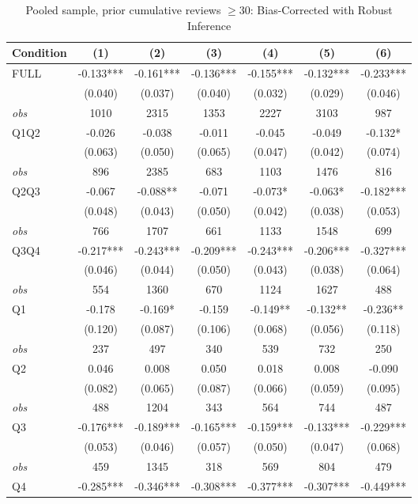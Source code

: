 \begin{table}[!htbp]
\centering
\caption{Pooled sample, prior cumulative reviews $\geq30$: Bias-Corrected with Robust Inference}
\begin{tabular}{lcccccc}
\toprule
Condition & (1) & (2) & (3) & (4) & (5) & (6) \\
\midrule
FULL & -0.133*** & -0.161*** & -0.136*** & -0.155*** & -0.132*** & -0.233*** \\
 & (0.040) & (0.037) & (0.040) & (0.032) & (0.029) & (0.046) \\
\textit{obs} & 1010 & 2315 & 1353 & 2227 & 3103 & 987 \\
Q1Q2 & -0.026 & -0.038 & -0.011 & -0.045 & -0.049 & -0.132* \\
 & (0.063) & (0.050) & (0.065) & (0.047) & (0.042) & (0.074) \\
\textit{obs} & 896 & 2385 & 683 & 1103 & 1476 & 816 \\
Q2Q3 & -0.067 & -0.088** & -0.071 & -0.073* & -0.063* & -0.182*** \\
 & (0.048) & (0.043) & (0.050) & (0.042) & (0.038) & (0.053) \\
\textit{obs} & 766 & 1707 & 661 & 1133 & 1548 & 699 \\
Q3Q4 & -0.217*** & -0.243*** & -0.209*** & -0.243*** & -0.206*** & -0.327*** \\
 & (0.046) & (0.044) & (0.050) & (0.043) & (0.038) & (0.064) \\
\textit{obs} & 554 & 1360 & 670 & 1124 & 1627 & 488 \\
Q1 & -0.178 & -0.169* & -0.159 & -0.149** & -0.132** & -0.236** \\
 & (0.120) & (0.087) & (0.106) & (0.068) & (0.056) & (0.118) \\
\textit{obs} & 237 & 497 & 340 & 539 & 732 & 250 \\
Q2 & 0.046 & 0.008 & 0.050 & 0.018 & 0.008 & -0.090 \\
 & (0.082) & (0.065) & (0.087) & (0.066) & (0.059) & (0.095) \\
\textit{obs} & 488 & 1204 & 343 & 564 & 744 & 487 \\
Q3 & -0.176*** & -0.189*** & -0.165*** & -0.159*** & -0.133*** & -0.229*** \\
 & (0.053) & (0.046) & (0.057) & (0.050) & (0.047) & (0.068) \\
\textit{obs} & 459 & 1345 & 318 & 569 & 804 & 479 \\
Q4 & -0.285*** & -0.346*** & -0.308*** & -0.377*** & -0.307*** & -0.449*** \\

\end{tabular}
\end{table}
